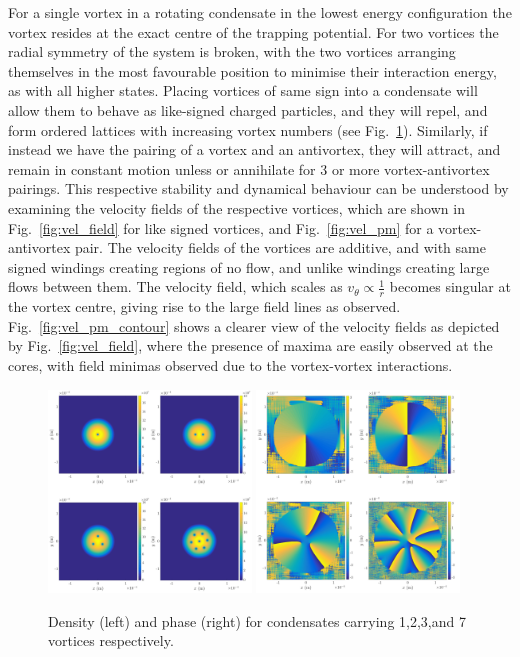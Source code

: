 For a single vortex in a rotating condensate in the lowest energy configuration the vortex resides at the exact centre of the trapping potential. For two vortices the radial symmetry of the system is broken, with the two vortices arranging themselves in the most favourable position to minimise their interaction energy, as with all higher states. Placing vortices of same sign into a condensate will allow them to behave as like-signed charged particles, and they will repel, and form ordered lattices with increasing vortex numbers (see Fig.~\ref{fig:few_rho}). Similarly, if instead we have the pairing of a vortex and an antivortex, they will attract, and remain in constant motion unless or annihilate for 3 or more vortex-antivortex pairings. This respective stability and dynamical behaviour can be understood by examining the velocity fields of the respective vortices, which are shown in Fig.~\ref{fig:vel_field} for like signed vortices, and Fig.~\ref{fig:vel_pm} for a vortex-antivortex pair. The velocity fields of the vortices are additive, and with same signed windings creating regions of no flow, and unlike windings creating large flows between them. The velocity field, which scales as $v_{\theta} \propto \frac{1}{r}$ becomes singular at the vortex centre, giving rise to the large field lines as observed. Fig.~\ref{fig:vel_pm_contour} shows a clearer view of the velocity fields as depicted by Fig.~\ref{fig:vel_field}, where the presence of maxima are easily observed at the cores, with field minimas observed due to the vortex-vortex interactions.

\begin{figure}\centering
    \includegraphics[width=0.48\textwidth]{Images/ch4_vtx/fewvortex_rho.pdf}
    \includegraphics[width=0.48\textwidth]{Images/ch4_vtx/fewvortex_theta.pdf}
    \caption{Density (left) and phase (right) for condensates carrying 1,2,3,and 7 vortices respectively.}
    \label{fig:few_rho}
\end{figure}

